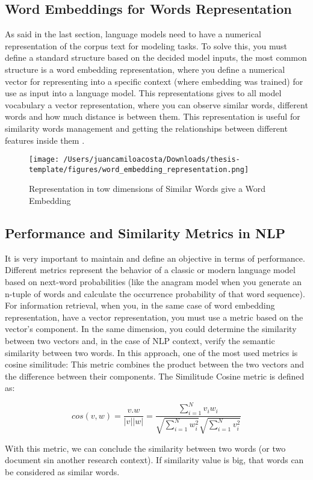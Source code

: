 \subsection{Word Embeddings for Words Representation}
As said in the last section, language models need to have a numerical representation of the corpus text for modeling tasks. To solve this, you must define a standard structure based on the decided model inputs, the most common structure is a word embedding representation, where you define a numerical vector for representing into a specific context (where embedding was trained) for use as input into a language model. This representations gives to all model vocabulary a vector representation, where you can observe similar words, different words and how much distance is between them. This representation is useful for similarity words management and getting the relationships between different features inside them \citet{nlp-fundamentals}. 

    \begin{figure}[H]
    \centering
    \texttt{[image: /Users/juancamiloacosta/Downloads/thesis-template/figures/word\_embedding\_representation.png]}
    \caption{Representation in tow dimensions of Similar Words give a Word Embedding \citet{nlp-fundamentals} }
    \label{fig:word-embedding}
    \end{figure}

\subsection{Performance and Similarity Metrics in NLP}
It is very important to maintain and define an objective in terms of performance. Different metrics represent the behavior of a classic or modern language model based on next-word probabilities (like the anagram model when you generate an n-tuple of words and calculate the occurrence probability of that word sequence). For information retrieval, when you, in the same case of word embedding representation, have a vector representation, you must use a metric based on the vector's component. In the same dimension, you could determine the similarity between two vectors and, in the case of NLP context, verify the semantic similarity between two words. In this approach, one of the most used metrics is cosine similitude: This metric combines the product between the two vectors and the difference between their components. The Similitude Cosine metric is defined as:

\begin{equation}
cos(v,w) = \frac{v.w}{|v||w|} = \frac{\sum_{i=1}^{N} v_{i}w_{i}}{\sqrt{\sum_{i=1}^{N} w_{i}^{2}} \sqrt{\sum_{i=1}^{N} v_{i}^{2}}}
\end{equation}

With this metric, we can conclude the similarity between two words (or two document sin another research context). If similarity value is big, that words can be considered as similar words.